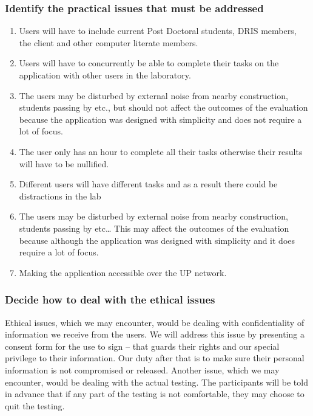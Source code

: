 \documentclass[12pt]{article}
\begin{document}
\subsubsection{Identify the practical issues that must be addressed}
\begin{enumerate}

\item	Users will have to include current Post Doctoral students, DRIS members, the client and other computer literate members.
\item Users will have to concurrently be able to complete their tasks on the application with other users in the laboratory.
\item The users may be disturbed by external noise from nearby construction, students passing by etc., but should not affect the outcomes of the evaluation because the application was designed with simplicity and does not require a lot of focus.
\item The user only has an hour to complete all their tasks otherwise their results will have to be nullified. 
\item	Different users will have different tasks and as a result there could be distractions in the lab
\item	The users may be disturbed by external noise from nearby construction, students passing by etc… This may affect the outcomes of the evaluation because although the application was designed with simplicity and it does require a lot of focus.
\item Making the application accessible over the UP network.

\end{enumerate}

\subsubsection{Decide how to deal with the ethical issues}

Ethical issues, which we may encounter, would be dealing with confidentiality of information we receive from the users. We will address this issue by presenting a consent form for the use to sign – that guards their rights and our special privilege to their information. Our duty after that is to make sure their personal information is not compromised or released. Another issue, which we may encounter, would be dealing with the actual testing. The participants will be told in advance that if any part of the testing is not comfortable, they may choose to quit the testing. 
\end{document}
